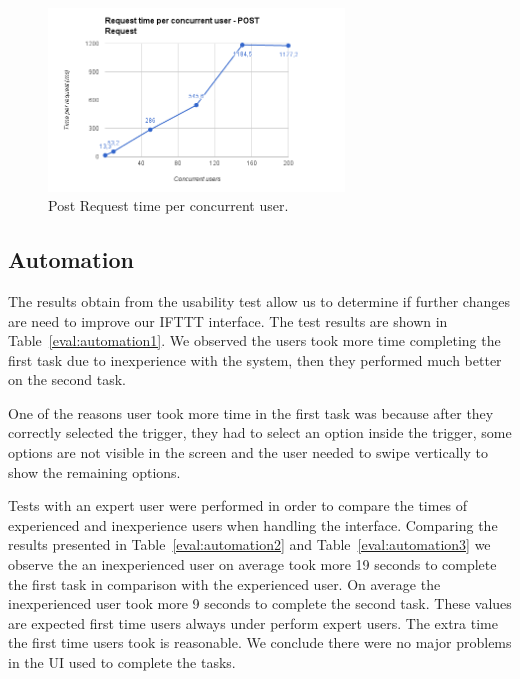 \begin{figure}[H]
\centering
\includegraphics[width=0.7\textwidth]{Figures/bench_post}
\caption{Post Request time per concurrent user.}
\label{eval:server2}
\end{figure}





\subsection{Automation}

The results obtain from the usability test allow us to determine if further changes are need to improve our \ac{IFTTT} interface. The test results are shown in  Table~\ref{eval:automation1}. We observed the users took more time completing the first task due to inexperience with the system, then they performed much better on the second task. 

One of the reasons user took more time in the first task was because after they correctly selected the trigger, they had to select an option inside the trigger, some options are not visible in the screen and the user needed to swipe vertically to show the remaining options.

Tests with an expert user were performed in order to compare the times of experienced and inexperience users when handling the interface. Comparing the results presented in Table~\ref{eval:automation2} and Table~\ref{eval:automation3} we observe the an inexperienced user on average took more 19 seconds to complete the first task in comparison with the experienced user. On average the inexperienced user took more 9 seconds to complete the second task. These values are expected first time users always under perform expert users. The extra time the first time users took is reasonable. We conclude there were no major problems in the \ac{UI} used to complete the tasks.

 



